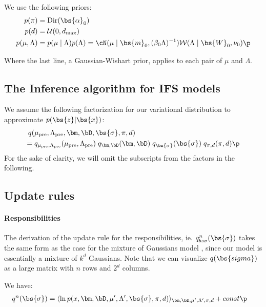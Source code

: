 We use the following priors:
\begin{align*}
p(\pi) &= \text{Dir}(\bs{\alpha}_0) \\
p(d) &= {\cal U}(0, d_\text{max}) \\
p(\mu, \Lambda) &= p(\mu \mid \Lambda) p(\Lambda) = \cN(\mu \mid \bs{m}_0, (\beta_0\Lambda)^{-1}) {\cal W}(\Lambda \mid \bs{W}_0, \nu_0) \p
\end{align*}

Where the last line, a Gaussian-Wishart prior, applies to each pair of $\mu$ and $\Lambda$.

\subsection{The Inference algorithm for IFS models}
We assume the following factorization for our variational distribution to approximate  $p(\bs{z}|\bs{x})$:
\begin{align*}
q(& \mu_\text{pre}, \Lambda_\text{pre}, \bm, \bD, \bs{\sigma}, \pi, d) \\ 
=\;&  q_{\mu_\text{pre}, \Lambda_\text{pre}}(\mu_\text{pre}, \Lambda_\text{pre}) \; q_{\bm, \bD}(\bm, \bD)\; q_{\bs{\sigma}}(\bs{\sigma}) \; q_{\pi, d}(\pi, d) \p \\
\end{align*}
For the sake of clarity, we will omit the subscripts from the factors in the following.

\subsection{Update rules}

\paragraph{Responsibilities}

The derivation of the update rule for the responsibilities, ie. $q_{bs{\sigma}}^{n}(\bs{\sigma})$ takes the same form as the case for the mixture of Gaussians model \cite{}, since our model is essentially a mixture of $k^d$ Gaussians. Note that we can visualize $q(\bs{sigma})$ as a large matrix with $n$ rows and $2^d$ columns.

We have:
\begin{align*}
q^n(\bs{\sigma}) &= \langle \ln p(x, \bm, \bD, \mu', \Lambda', \bs{\sigma}, \pi, d) \rangle_{\bm, \bD, \mu', \Lambda', \pi, d} + const \p
\end{align*}

